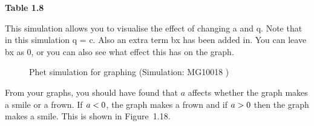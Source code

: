 {\begin{center}
\begin{xtabular*}{\mytablewidth}[t]{|p{10\mystarwidth}|p{10\mystarwidth}|p{10\mystarwidth}|p{10\mystarwidth}|p{10\mystarwidth}|p{10\mystarwidth}|}
     \tabularnewline{}
    \end{xtabular*}
      \end{center}
    \begin{center}{\small\bfseries Table 1.8}\end{center}
        }%
    \par
        \label{m39345*eip-679}This simulation allows you to visualise the effect of changing a and q. Note that in this simulation q = c. Also an extra term bx has been added in. You can leave bx as 0, or you can also see what effect this has on the graph.
\par \label{m39345*eip-481}
    \setcounter{subfigure}{0}
	\begin{figure}[H] %
    \textnormal{Phet simulation for graphing}\vspace{.1in} \nopagebreak
  \label{m39345*phet!!!underscore!!!sim}\label{m39345*phet-simulation}
             { (Simulation:  MG10018 )}
      \vspace{2pt}
    \vspace{.1in}
 \end{figure}       \par \label{m39345*id241684}From your graphs, you should have found that $a$ affects whether the graph makes a smile or a frown. If $a<{}0$, the graph makes a frown and if $a>{}0$ then the graph makes a smile. This is shown in Figure~1.18.\par 
    \setcounter{subfigure}{0}
